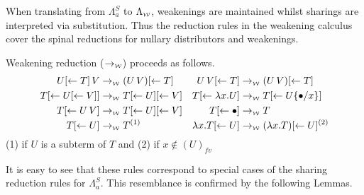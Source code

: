\documentclass[runningheads]{llncs}
\newcommand{\FALC}{\Lambda^{S}_{a}}
\newcommand{\WEAK}{\Lambda_{\weaksymbol}}
\newcommand{\fv}[1]{(#1)_{fv}}
\newcommand{\abs}[2]{\lambda #1 . #2}
\newcommand{\app}[2]{#1 \, #2}
\newcommand{\share}[3]{#1 [#2 \leftarrow #3]}
\newcommand{\sub}[3]{#1 \{ #2 / #3 \}}
\newcommand{\weaksymbol}{\mbox{\tiny $\mathcal{W}$}}
\begin{document}
When translating from $\FALC$ to $\WEAK$, weakenings are maintained whilst sharings are interpreted via substitution. Thus the reduction rules in the weakening calculus cover the spinal reductions for nullary distributors and weakenings.

\begin{definition}
Weakening reduction ($\rightarrow_{\weaksymbol}$) proceeds as follows.
\begingroup
\allowdisplaybreaks
\begin{align*}
	\app{\share{U}{}{T}}{V} &\rightarrow_{\weaksymbol} (\app{U}{V}) \share{}{}{T} &
	\app{U}{\share{V}{}{T}} &\rightarrow_{\weaksymbol} (\app{U}{V}) \share{}{}{T} \\
	\share{T}{}{\share{U}{}{V}} &\rightarrow_{\weaksymbol} \share{T}{}{U} \share{}{}{V} &
	\share{T}{}{\abs{x}{U}} &\rightarrow_{\weaksymbol} \share{T}{}{U \sub{}{\bullet}{x}} \\
	\share{T}{}{\app{U}{V}} &\rightarrow_{\weaksymbol} T \share{}{}{U} \share{}{}{V} &
	\share{T}{}{\bullet} &\rightarrow_{\weaksymbol} T \\
	\share{T}{}{U} &\rightarrow_{\weaksymbol} T^{(1)} &
	\abs{x}{\share{T}{}{U}} &\rightarrow_{\weaksymbol} (\abs{x}{T})\share{}{}{U}^{(2)} 
\end{align*}
{\small (1) if $U$ is a subterm of $T$} and {\small (2) if  $x \not\in \fv{U}$}
\endgroup
\end{definition}
\noindent It is easy to see that these rules correspond to special cases of the sharing reduction rules for $\FALC$. This resemblance is confirmed by the following Lemmas.
\end{document}
